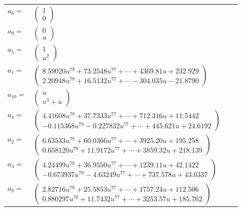 \documentclass[1p]{elsarticle_modified}
\theoremstyle{definition}
\begin{document}
\begin{tabular}{m{7pt} m{180pt} m{7pt} m{180pt} }
\flushright $a_{6}=$&$\begin{pmatrix}1\\0\end{pmatrix}$ \\
\flushright $a_{9}=$&$\begin{pmatrix}0\\u\end{pmatrix}$ \\
\flushright $a_{5}=$&$\begin{pmatrix}1\\u^2\end{pmatrix}$ \\
\flushright $a_{1}=$&$\begin{pmatrix}8.59020 u^{78}+73.2548 u^{77}+\cdots+4369.81 u+232.929\\2.20948 u^{78}+16.5132 u^{77}+\cdots-304.035 u-21.8790\end{pmatrix}$ \\
\flushright $a_{10}=$&$\begin{pmatrix}u\\u^3+u\end{pmatrix}$ \\
\flushright $a_{4}=$&$\begin{pmatrix}4.41608 u^{78}+37.7333 u^{77}+\cdots+712.316 u+11.5442\\-0.115368 u^{78}-0.227832 u^{77}+\cdots+445.621 u+24.6192\end{pmatrix}$ \\
\flushright $a_{2}=$&$\begin{pmatrix}6.63533 u^{78}+60.0366 u^{77}+\cdots+3925.20 u+195.258\\0.658120 u^{78}+11.9172 u^{77}+\cdots+3859.32 u+218.139\end{pmatrix}$ \\
\flushright $a_{3}=$&$\begin{pmatrix}4.24499 u^{78}+36.9550 u^{77}+\cdots+1239.11 u+42.1422\\-0.673937 u^{78}-4.63249 u^{77}+\cdots+737.578 u+43.0337\end{pmatrix}$ \\
\flushright $a_{8}=$&$\begin{pmatrix}2.82716 u^{78}+25.5853 u^{77}+\cdots+1757.24 u+112.506\\0.880297 u^{78}+11.7432 u^{77}+\cdots+3253.57 u+185.762\end{pmatrix}$ \\

\end{tabular}
\end{document}
